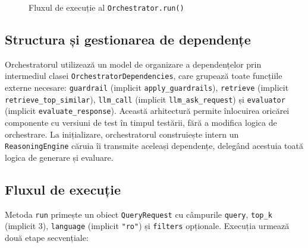 \documentclass[12pt, a4paper, oneside, romanian]{teza-upb}
\begin{document}
\begin{figure}[H]
\centering
{}
\caption{Fluxul de execuție al \texttt{Orchestrator.run()}}
\label{fig:orchestrator}
\end{figure}

\subsection{Structura și gestionarea de dependențe}

Orchestratorul utilizează un model de organizare a dependențelor prin intermediul 
clasei \texttt{OrchestratorDependencies}, care grupează toate funcțiile externe necesare: \texttt{guardrail} (implicit \texttt{apply\_guardrails}), \texttt{retrieve} (implicit \texttt{retrieve\_top\_similar}), \texttt{llm\_call} (implicit \texttt{llm\_ask\_request}) și \texttt{evaluator} (implicit \texttt{evaluate\_response}). Această arhitectură permite înlocuirea oricărei componente cu versiuni de test în timpul testării, fără a modifica logica de orchestrare. La inițializare, orchestratorul construiește intern un \texttt{ReasoningEngine} căruia îi transmite aceleași dependențe, delegând acestuia toată logica de generare și evaluare.

\subsection{Fluxul de execuție}

Metoda \texttt{run} primește un obiect \texttt{QueryRequest} cu câmpurile \texttt{query}, \texttt{top\_k} (implicit 3), \texttt{language} (implicit \texttt{"ro"}) și \texttt{filters} opționale. Execuția urmează două etape secvențiale:
\end{document}
